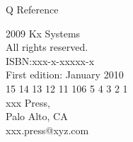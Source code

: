 \begingroup
\begin{center}
\vspace*{\baselineskip}
{\Huge Q Reference}\\[\baselineskip]
\bigskip
\kxlogo
\vfill
\vspace*{\baselineskip}
\clearpage
\end{center}
\endgroup
\newpage

\begingroup
\raggedright
\parindent 0pt
\parskip \baselineskip
\textcopyright{} 2009 Kx Systems \\
All rights reserved.\\
\bigskip
ISBN:xxx-x-xxxxx-x\\
First edition: January 2010 \\
15 14 13 12 11 10\hspace{2em}6 5 4 3 2 1\\
\bigskip
\bigskip
xxx Press,\\
Palo Alto, CA\\
xxx.press@xyz.com\\ 
\vspace*{2\baselineskip}
\clearpage
\endgroup

\pagestyle{plain}
\setupshorttoc
\tableofcontents
\cleardoublepage
\setupmaintoc
\tableofcontents
\cleardoublepage

